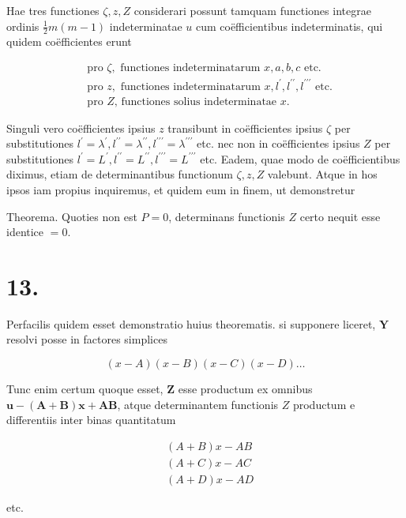 \documentclass[10pt]{article}
\begin{document}
Hae tres functiones \(\zeta, z, Z\) considerari possunt tamquam functiones integrae ordinis \(\frac{1}{2} m(m-1)\) indeterminatae \(u\) cum coëfficientibus indeterminatis, qui
quidem coëfficientes erunt

\[
\begin{aligned}
& \text { pro } \zeta, \text { functiones indeterminatarum } x, a, b, c \text { etc. } \\
& \text { pro } z, \text { functiones indeterminatarum } x, l^{\prime}, l^{\prime \prime}, l^{\prime \prime \prime} \text { etc. } \\
& \text { pro } Z \text {, functiones solius indeterminatae } x .
\end{aligned}
\]

Singuli vero coëfficientes ipsius \(z\) transibunt in coëfficientes ipsius \(\zeta\) per substitutiones \(l^{\prime}=\lambda^{\prime}, l^{\prime \prime}=\lambda^{\prime \prime}, l^{\prime \prime \prime}=\lambda^{\prime \prime \prime}\) etc. nec non in coëfficientes ipsius \(Z\) per substitutiones \(l^{\prime}=L^{\prime}, l^{\prime \prime}=L^{\prime \prime}, l^{\prime \prime \prime}=L^{\prime \prime \prime}\) etc. Eadem, quae modo de coëfficientibus diximus, etiam de determinantibus functionum \(\zeta, z, Z\) valebunt. Atque in hos ipsos iam propius inquiremus, et quidem eum in finem, ut demonstretur

Theorema. Quoties non est \(P=0\), determinans functionis \(Z\) certo nequit esse identice \(=0\).

\section*{13.}
Perfacilis quidem esset demonstratio huius theorematis. si supponere liceret, \(\boldsymbol{Y}\) resolvi posse in factores simplices

\[
(x-A)(x-B)(x-C)(x-D) \ldots
\]

Tunc enim certum quoque esset, \(\boldsymbol{Z}\) esse productum ex omnibus \(\boldsymbol{u}-(\boldsymbol{A}+\boldsymbol{B}) \boldsymbol{x}+\boldsymbol{A} \boldsymbol{B}\), atque determinantem functionis \(Z\) productum e differentiis inter binas quantitatum

\[
\begin{aligned}
& (A+B) x-A B \\
& (A+C) x-A C \\
& (A+D) x-A D
\end{aligned}
\]

etc.
\end{document}
